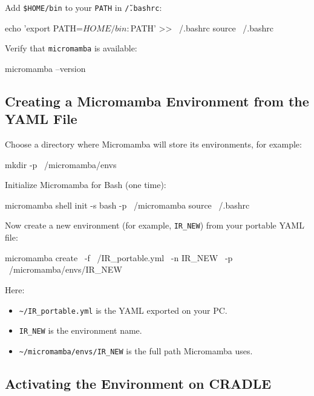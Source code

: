\documentclass[11pt]{article}
\begin{document}
Add \texttt{\$HOME/bin} to your \texttt{PATH} in \texttt{\~/.bashrc}:\\
\begin{codeblock}
echo 'export PATH=$HOME/bin:$PATH' >> ~/.bashrc
source ~/.bashrc
\end{codeblock}

Verify that \texttt{micromamba} is available:\\
\begin{codeblock}
micromamba --version
\end{codeblock}

\subsection{Creating a Micromamba Environment from the YAML File}
\label{subsec:create-micromamba-env}

Choose a directory where Micromamba will store its environments, for example:\\
\begin{codeblock}
mkdir -p ~/micromamba/envs
\end{codeblock}

Initialize Micromamba for Bash (one time):\\

\begin{codeblock}
micromamba shell init -s bash -p ~/micromamba
source ~/.bashrc
\end{codeblock}

Now create a new environment (for example, \texttt{IR\_NEW}) from your portable
YAML file:\\

\begin{codeblock}
micromamba create \
  -f ~/IR_portable.yml \
  -n IR_NEW \
  -p ~/micromamba/envs/IR_NEW
\end{codeblock}

Here:
\begin{itemize}
  \item \texttt{\~{}/IR\_portable.yml} is the YAML exported on your PC.
  \item \texttt{IR\_NEW} is the environment name.
  \item \texttt{\~{}/micromamba/envs/IR\_NEW} is the full path Micromamba uses.
\end{itemize}

\subsection{Activating the Environment on CRADLE}
\label{subsec:activate-micromamba}
\end{document}
